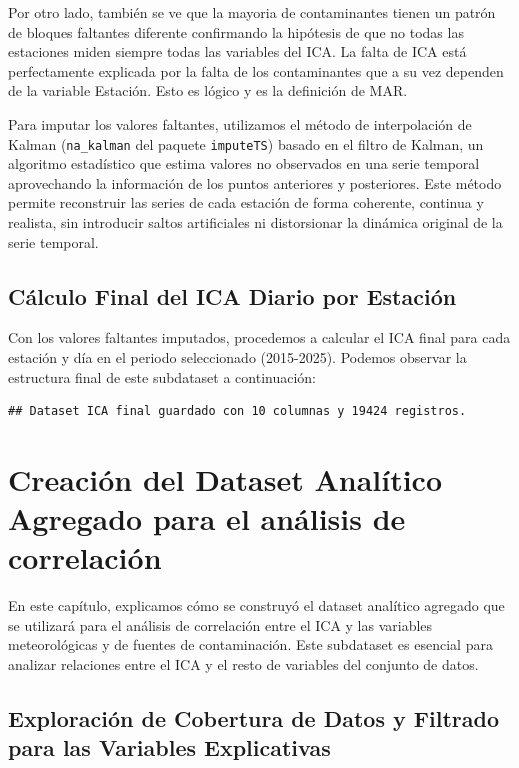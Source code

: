 \documentclass[,,,moreauthors,pdftex]{Definitions/mdpi}
\begin{document}
Por otro lado, también se ve que la mayoria de contaminantes tienen un
patrón de bloques faltantes diferente confirmando la hipótesis de que no
todas las estaciones miden siempre todas las variables del ICA. La falta
de ICA está perfectamente explicada por la falta de los contaminantes
que a su vez dependen de la variable Estación. Esto es lógico y es la
definición de MAR.

Para imputar los valores faltantes, utilizamos el método de
interpolación de Kalman (\texttt{na\_kalman} del paquete
\texttt{imputeTS}) basado en el filtro de Kalman, un algoritmo
estadístico que estima valores no observados en una serie temporal
aprovechando la información de los puntos anteriores y posteriores. Este
método permite reconstruir las series de cada estación de forma
coherente, continua y realista, sin introducir saltos artificiales ni
distorsionar la dinámica original de la serie temporal.

\subsection{Cálculo Final del ICA Diario por
Estación}\label{cuxe1lculo-final-del-ica-diario-por-estaciuxf3n}

Con los valores faltantes imputados, procedemos a calcular el ICA final
para cada estación y día en el periodo seleccionado (2015-2025). Podemos
observar la estructura final de este subdataset a continuación:

\begin{verbatim}
## Dataset ICA final guardado con 10 columnas y 19424 registros.
\end{verbatim}

\section{Creación del Dataset Analítico Agregado para el análisis de
correlación}\label{creaciuxf3n-del-dataset-analuxedtico-agregado-para-el-anuxe1lisis-de-correlaciuxf3n}

En este capítulo, explicamos cómo se construyó el dataset analítico
agregado que se utilizará para el análisis de correlación entre el ICA y
las variables meteorológicas y de fuentes de contaminación. Este
subdataset es esencial para analizar relaciones entre el ICA y el resto
de variables del conjunto de datos.

\subsection{Exploración de Cobertura de Datos y Filtrado para las
Variables
Explicativas}\label{exploraciuxf3n-de-cobertura-de-datos-y-filtrado-para-las-variables-explicativas}
\end{document}
